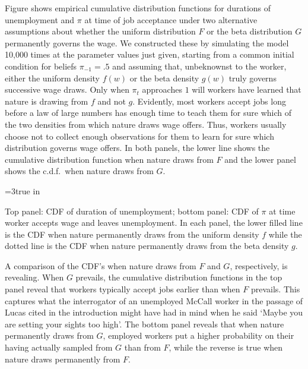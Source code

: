 Figure  shows empirical cumulative distribution functions for durations of unemployment and $\pi$ at time of job acceptance under two alternative assumptions about whether
the uniform distribution $F$ or the beta distribution $G$ permanently governs the wage.
We constructed these by  simulating   the model 10,000 times at the  parameter values just given, starting from a common  initial condition
for beliefs
$\pi_{-1} = .5$ and assuming that, unbeknownst to the worker,  either the uniform density $f(w)$ or the beta density $g(w)$ truly governs successive  wage draws.  Only when $\pi_t$ approaches $1$ will workers have learned
that nature is drawing from $f$ and not $g$.  Evidently,
most workers accept jobs long before a law of large numbers has enough time to teach them  for sure which of the two densities from which   nature draws wage offers. Thus, workers usually choose not to collect enough observations for them to learn for sure which distribution governs wage offers.   In both panels, the lower line shows the cumulative distribution function when nature draws from $F$ and the lower panel shows the c.d.f.\ when nature draws from $G$.
%
%


\centerline{\epsfxsize=3true in}
\caption{Top panel: CDF of duration of unemployment; bottom panel: CDF of $\pi$ at time worker accepts wage
and leaves unemployment. In each panel, the lower filled line is the CDF when nature permanently draws from the uniform density $f$ while
the dotted line is the CDF when nature permanently draws from the beta density $g$.}
\endfigure


A comparison of the CDF's when nature draws from $F$ and $G$, respectively, is revealing.  When $G$ prevails, the cumulative distribution functions in the top panel reveal that workers typically accept jobs earlier
than when $F$ prevails.  This  captures  what the interrogator of an unemployed  McCall worker in the passage of Lucas cited in the introduction might have had in mind when he said `Maybe you are setting your sights too high'.
The bottom panel reveals that when nature permanently  draws from  $G$, employed workers put  a higher probability on their having actually sampled from $G$ than from $F$, while the reverse is true when nature draws permanently from $F$.


